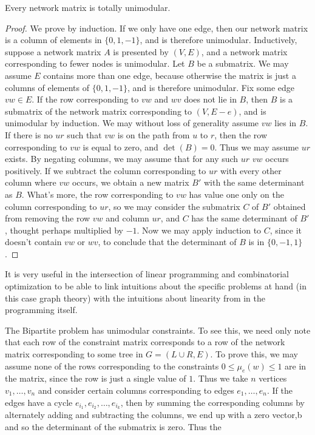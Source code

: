 \begin{theorem}
    Every network matrix is totally unimodular.
\end{theorem}
\begin{proof}
    We prove by induction. If we only have one edge, then our network matrix is a column of elements in $\{ 0, 1, -1 \}$, and is therefore unimodular. Inductively, suppose a network matrix $A$ is presented by $(V,E)$, and a network matrix corresponding to fewer nodes is unimodular. Let $B$ be a submatrix. We may assume $E$ contains more than one edge, because otherwise the matrix is just a columns of elements of $\{ 0, 1, -1 \}$, and is therefore unimodular. Fix some edge $vw \in E$. If the row corresponding to $vw$ and $wv$ does not lie in $B$, then $B$ is a submatrix of the network matrix corresponding to $(V,E-e)$, and is unimodular by induction. We may without loss of generality assume $vw$ lies in $B$. If there is no $ur$ such that $vw$ is on the path from $u$ to $r$, then the row corresponding to $vw$ is equal to zero, and $\det(B) = 0$. Thus we may assume $ur$ exists. By negating columns, we may assume that for any such $ur$ $vw$ occurs positively. If we subtract the column corresponding to $ur$ with every other column where $vw$ occurs, we obtain a new matrix $B'$ with the same determinant as $B$. What's more, the row corresponding to $vw$ has value one only on the column corresponding to $ur$, so we may consider the submatrix $C$ of $B'$ obtained from removing the row $vw$ and column $ur$, and $C$ has the same determinant of $B'$, thought perhaps multiplied by $-1$. Now we may apply induction to $C$, since it doesn't contain $vw$ or $wv$, to conclude that the determinant of $B$ is in $\{ 0, -1, 1 \}$.
\end{proof}

It is very useful in the intersection of linear programming and combinatorial optimization to be able to link intuitions about the specific problems at hand (in this case graph theory) with the intuitions about linearity from in the programming itself.

\begin{example}
    The Bipartite problem has unimodular constraints. To see this, we need only note that each row of the constraint matrix corresponds to a row of the network matrix corresponding to some tree in $G = (L \cup R, E)$. To prove this, we may assume none of the rows corresponding to the constraints $0 \leq \mu_e(w) \leq 1$ are in the matrix, since the row is just a single value of $1$. Thus we take $n$ vertices $v_1, \dots, v_n$ and consider certain columns corresponding to edges $e_1, \dots, e_n$. If the edges have a cycle $e_{i_1}, e_{i_2}, \dots, e_{i_k}$, then by summing the corresponding columns by alternately adding and subtracting the columns, we end up with a zero vector,b and so the determinant of the submatrix is zero. Thus the 
\end{example}

